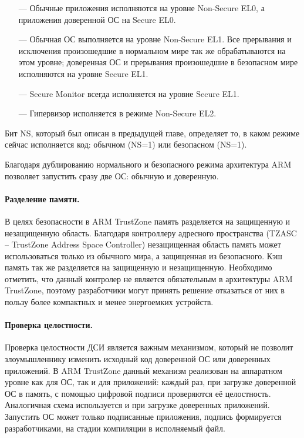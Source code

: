 \begin{itemize}
	\item [---] Обычные приложения исполняются на уровне Non-Secure EL0, а приложения доверенной ОС на Secure EL0.
	\item [---] Обычная ОС выполняется на уровне Non-Secure EL1. Все прерывания и исключения произошедшие в нормальном мире так же обрабатываются на этом уровне; доверенная ОС и прерывания произошедшие в безопасном мире исполняются на уровне Secure EL1.
	\item [---] Secure Monitor всегда исполняется на уровне Secure EL1.
	\item [---] Гипервизор исполняется в режиме Non-Secure EL2.
\end{itemize}

Бит NS, который был описан в предыдущей главе, определяет то, в каком режиме сейчас исполняется код: обычном (NS=1) или безопасном (NS=1).

Благодаря дублированию нормального и безопасного режима архитектура ARM позволяет запустить сразу две ОС: обычную и доверенную.

\paragraph{Разделение памяти.}

В целях безопасности в ARM TrustZone память разделяется на защищенную и незащищенную область. Благодаря контроллеру адресного пространства (TZASC -- TrustZone Address Space Controller) незащищенная область память может использоваться только из обычного мира, а защищенная из безопасного. Кэш память так же разделяется на защищенную и незащищенную. Необходимо отметить, что данный контролер не является обязательным в архитектуры ARM TrustZone, поэтому разработчики могут принять решение отказаться от них в пользу более компактных и менее энергоемких устройств.

\paragraph{Проверка целостности.}

Проверка целостности ДСИ является важным механизмом, который не позволит злоумышленнику изменить исходный код доверенной ОС или доверенных приложений. В ARM TrustZone данный механизм реализован на аппаратном уровне как для ОС, так и для приложений: каждый раз, при загрузке доверенной ОС в память, с помощью цифровой подписи проверяются её целостность. Аналогичная схема используется и при загрузке доверенных приложений. Запустить ОС может только подписанные приложения, подпись формируется разработчиками, на стадии компиляции в исполняемый файл.

